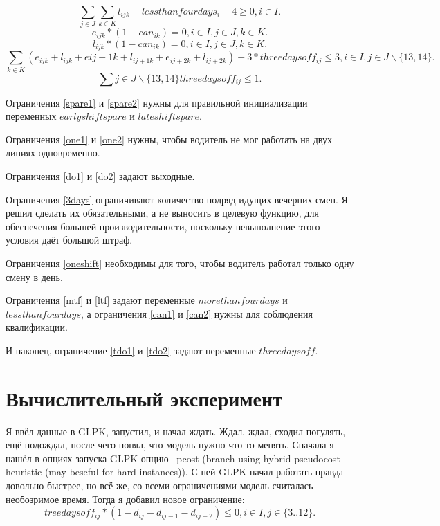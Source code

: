 \documentclass[]{article}
\begin{document}
\begin{equation}\label{ltf}
  \sum_{j \in J}\sum_{k \in K} l_{ijk} - lessthanfourdays_{i} - 4 \geq 0, i \in I.
\end{equation}
\begin{equation}\label{can1}
  e_{ijk}*(1-can_{ik}) = 0, i \in I, j \in J, k \in K.
\end{equation}
\begin{equation}\label{can2}
  l_{ijk}*(1-can_{ik}) = 0, i \in I, j \in J, k \in K.
\end{equation}
\begin{equation}\label{tdo1}
  \sum_{k \in K} (e_{ijk}+l_{ijk}+e{ij+1k}+l_{ij+1k}+e_{ij+2k}+l_{ij+2k})
        + 3*threedaysoff_{ij} \leq 3, i \in I, j \in J\backslash\{13,14\}.
\end{equation}
\begin{equation}\label{tdo2}
  \sum {j \in  J\backslash\{13,14\}} threedaysoff_{ij} \leq 1.
\end{equation}

Ограничения \eqref{spare1} и \eqref{spare2} нужны для правильной
 инициализации переменных $earlyshiftspare$ и $lateshiftspare$.

Ограничения \eqref{one1} и \eqref{one2} нужны, чтобы водитель не
мог работать на двух линиях одновременно.

Ограничения \eqref{do1} и \eqref{do2} задают выходные.

Ограничения \eqref{3days} ограничивают количество подряд идущих вечерних
смен. Я решил сделать их обязательными, а не выносить в целевую функцию,
для обеспечения большей производительности, поскольку невыполнение этого
условия даёт большой штраф.

Ограничения \eqref{oneshift} необходимы для того, чтобы водитель работал только одну
смену в день.

Ограничения \eqref{mtf} и \eqref{ltf} задают переменные $morethanfourdays$ и
$lessthanfourdays$, а ограничения \eqref{can1} и \eqref{can2} нужны для соблюдения
квалификации.

И наконец, ограничение \eqref{tdo1} и \eqref{tdo2} задают переменные $threedaysoff$.
\section{Вычислительный эксперимент}
Я ввёл данные в GLPK, запустил, и начал ждать. Ждал, ждал, сходил погулять, ещё подождал,
после чего понял, что модель нужно что-то менять. Сначала я нашёл в опциях запуска
GLPK опцию --pcost (branch using hybrid pseudocost heuristic (may beseful for hard instances)).
С ней GLPK начал работать правда довольно быстрее, но всё же, со всеми ограничениями
модель считалась необозримое время.  Тогда я добавил новое ограничение:
\begin{equation}
  treedaysoff_{ij}*(1-d_{ij}-d_{ij-1}-d_{ij-2}) \leq 0, i \in I, j \in \{3..12\}.
\end{equation}
\end{document}
